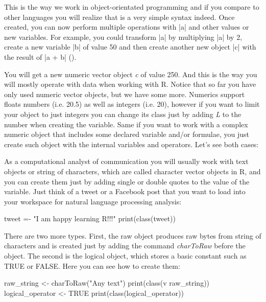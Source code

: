 This is the way we work in object-orientated programming and if you
compare to other languages you will realize that is a very simple
syntax indeed. Once created, you can now perform multiple operations
with |a| and other values or new variables. For example, you
could transform |a| by multiplying |a| by 2, create a new
variable |b| of value 50 and then create another new object
|c| with the result of |a + b| ().



You will get a new numeric vector object \emph{c} of value 250. And
this is the way you will mostly operate with data when working with
R. Notice that so far you have only used numeric vector objects, but
we have some more. Numerics support floats numbers (i.e. 20.5) as well
as integers (i.e. 20), however if you want to limit your object to
just integers you can change its class just by adding \emph{L} to the
number when creating the variable. Same if you want to work with a
complex numeric object that includes some declared variable and/or
formulae, you just create such object with the internal variables and
operators. Let’s see both cases:




As a computational analyst of communication you will usually work with text objects or string of characters, which are called character vector objects in R, and you can create them just by adding single or double quotes to the value of the variable. Just think of a tweet or a Facebook post that you want to load into your workspace for natural language processing analysis:

\begin{exampler}
tweet =- "I am happy learning R!!!"
print(class(tweet))
\end{exampler}

There are two more types. First, the raw object produces raw bytes from string of characters and is created just by adding the command \emph{charToRaw} before the object. The second is the logical object, which stores a basic constant such as TRUE or FALSE. Here you can see how to create them:

\begin{exampler}
raw_string <- charToRaw("Any text")
print(class(v raw_string))
logical_operator <- TRUE 
print(class(logical_operator))
\end{exampler}

